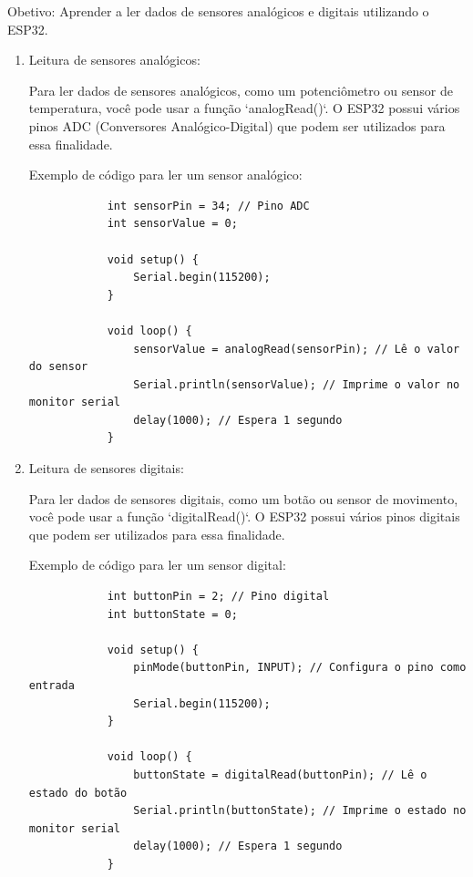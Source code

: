 \documentclass[a4paper]{article}
\begin{document}
    \begin{answer}

        Obetivo: Aprender a ler dados de sensores analógicos e digitais utilizando o ESP32.
        \begin{enumerate}
            \item Leitura de sensores analógicos:

                Para ler dados de sensores analógicos, como um potenciômetro ou sensor de temperatura, você pode usar a função `analogRead()`. O ESP32 possui vários pinos ADC (Conversores Analógico-Digital) que podem ser utilizados para essa finalidade.

                Exemplo de código para ler um sensor analógico:

            \begin{verbatim}
            int sensorPin = 34; // Pino ADC
            int sensorValue = 0;

            void setup() {
                Serial.begin(115200);
            }

            void loop() {
                sensorValue = analogRead(sensorPin); // Lê o valor do sensor
                Serial.println(sensorValue); // Imprime o valor no monitor serial
                delay(1000); // Espera 1 segundo
            }
            \end{verbatim}

            \item Leitura de sensores digitais:

                Para ler dados de sensores digitais, como um botão ou sensor de movimento, você pode usar a função `digitalRead()`. O ESP32 possui vários pinos digitais que podem ser utilizados para essa finalidade.

                Exemplo de código para ler um sensor digital:

            \begin{verbatim}
            int buttonPin = 2; // Pino digital
            int buttonState = 0;

            void setup() {
                pinMode(buttonPin, INPUT); // Configura o pino como entrada
                Serial.begin(115200);
            }

            void loop() {
                buttonState = digitalRead(buttonPin); // Lê o estado do botão
                Serial.println(buttonState); // Imprime o estado no monitor serial
                delay(1000); // Espera 1 segundo
            }
            \end{verbatim}
        \end{enumerate}
    \end{answer}
\end{document}
